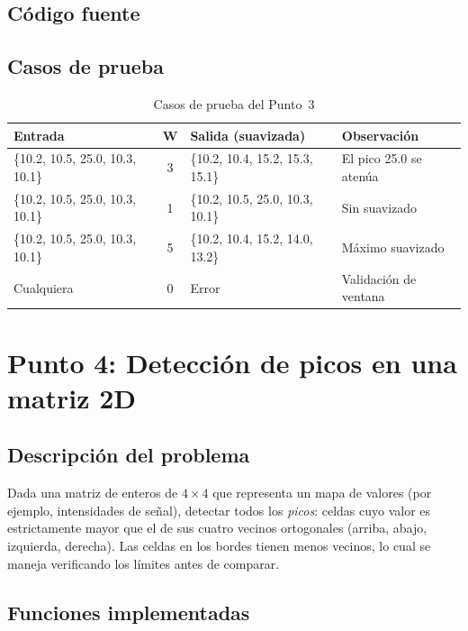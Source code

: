 \documentclass[12pt, letterpaper]{article}
\begin{document}
\subsection{Código fuente}



\subsection{Casos de prueba}

\begin{table}[H]
\centering
\small
\begin{tabular}{|p{3.5cm}|c|p{3.5cm}|p{3.5cm}|}
\hline
\textbf{Entrada} & \textbf{W} & \textbf{Salida (suavizada)} & \textbf{Observación} \\
\hline
\{10.2, 10.5, 25.0, 10.3, 10.1\} & 3 &
\{10.2, 10.4, 15.2, 15.3, 15.1\} & El pico 25.0 se atenúa \\
\hline
\{10.2, 10.5, 25.0, 10.3, 10.1\} & 1 &
\{10.2, 10.5, 25.0, 10.3, 10.1\} & Sin suavizado \\
\hline
\{10.2, 10.5, 25.0, 10.3, 10.1\} & 5 &
\{10.2, 10.4, 15.2, 14.0, 13.2\} & Máximo suavizado \\
\hline
Cualquiera & 0 &
Error & Validación de ventana \\
\hline
\end{tabular}
\caption{Casos de prueba del Punto~3}
\end{table}

\section{Punto 4: Detección de picos en una matriz 2D}

\subsection{Descripción del problema}

Dada una matriz de enteros de $4\times4$ que representa un mapa de valores
(por ejemplo, intensidades de señal), detectar todos los \textit{picos}: celdas
cuyo valor es estrictamente mayor que el de sus cuatro vecinos ortogonales
(arriba, abajo, izquierda, derecha). Las celdas en los bordes tienen menos
vecinos, lo cual se maneja verificando los límites antes de comparar.

\subsection{Funciones implementadas}
\end{document}
